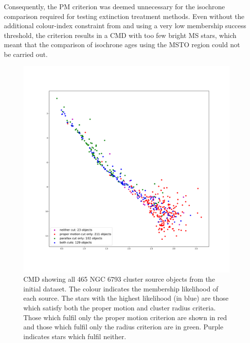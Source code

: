 \documentclass[12pt, a4paper]{report}
\begin{document}
Consequently, the PM criterion was deemed unnecessary for the isochrone comparison required for testing extinction treatment methods. Even without the additional colour-index constraint from \cite{2003ARep...47..263K} and using a very low membership success threshold, the criterion results in a CMD with too few bright MS stars, which meant that the comparison of isochrone ages using the MSTO region could not be carried out.

\begin{figure}[h!]
\begin{center}
\includegraphics[width=1.0\textwidth]{../NGC6793_pm3sig_vs_plx_cuts_obs_cmd_schilbach.pdf}
\caption{CMD showing all 465 NGC 6793 cluster source objects from the initial dataset. The colour indicates the membership likelihood of each source. The stars with the highest likelihood (in blue) are those which satisfy both the proper motion and cluster radius criteria. Those which fulfil only the proper motion criterion are shown in red and those which fulfil only the radius criterion are in green. Purple indicates stars which fulfil neither.}
\label{NGC_6793_cut_effects}
\end{center}
\end{figure}
\end{document}

